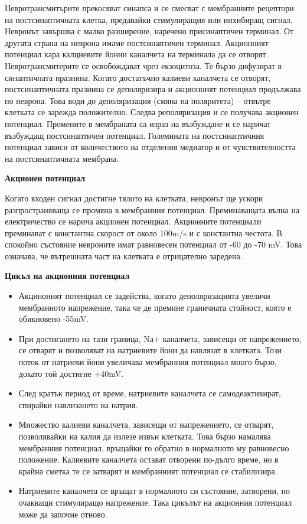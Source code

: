 \documentclass{article}
\numberwithin{equation}{section}
\begin{document}
Невротрансмитърите прекосяват синапса и се смесват с мембранните рецептори на постсинаптичната клетка, предавайки стимулиращия или инхибиращ
сигнал. Невронът завършва с малко разширение, наречено присинаптичен терминал. От другата страна на неврона имаме постсинаптичен терминал.
Акционният потенциал кара калциевите йонни каналчета на терминала да се отворят. Невротрансмитерите се освобождават чрез екзоцитоза. Те
бързо дифузират в синаптичната празнина. Когато достатъчно калиеви каналчета се отворят, постсинаптичната празнина се деполяризира и
акционният потенциал продължава по неврона. Това води до деполяризация (смяна на поляритета) -- отвътре клетката се зарежда положително.
Следва реполяризация и се получава акционен потенциал. Промените в мембраната  са израз на възбуждане и се наричат възбуждащ постсинаптичен
потенциал. Големината на постсинаптичния потенциал зависи от количеството на отделения медиатор и от чувствителността на постсинаптичната
мембрана.

\vspace{5mm} %
\textbf{Акционен потенциал}

Когато входен сигнал достигне тялото на клетката, невронът ще ускори разпространяваща се промяна в мембранния потенциал. Преминаващата вълна
на електричество се нарича акционен потенциал. Акционните потенциали преминават с константна скорост от около 100m/s и с константна честота.
В спокойно състояние невроните имат равновесен потенциал от -60 до -70 mV. Това означава, че вътрешната част на клетката е отрицателно
заредена.

\vspace{5mm} %
\textbf{Цикъл на акционния потенциал}

\begin{itemize}
\item Акциноният потенциал се задейства, когато деполяризацията увеличи мембранното напрежение, така че де премине граничната стойност, която е
обикновено -55mV.
\item При достигането на тази граница, Nа+ каналчета, зависещи от напрежението, се отварят и позволяват на натриевите йони да
навлязат в клетката. Този поток от натриеви йони увеличава мембранния потенциал много бързо, докато той достигне +40mV.
\item След кратък период от време, натриевите каналчета се самодеактивират, спирайки навлизането на натрия.
\item Множество калиеви каналчета, зависещи от напрежението, се отварят, позволявайки на калия да излезе извън клетката. Това бързо намалява
    мембранния потенциал, връщайки го обратно в нормалното му равновесно положение. Калиевите каналчета остават отворени по-дълго време, но
    в крайна сметка те се затварят и мембранният потенциал се стабилизира.
\item Натриевите каналчета се връщат в нормалното си състояние, затворени, но очакващи стимулиращо напрежение.  Така цикълът на акционния
потенциал може да започне отново.
\end{itemize}
\end{document}
